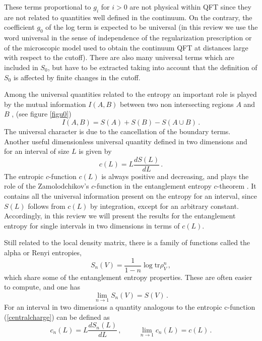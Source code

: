 \documentclass[a4paper]{article}
\begin{document}
These terms proportional to $g_i$ for $i> 0$ are not physical within QFT since they are not related to quantities well defined in the continuum. On the contrary, the coefficient $g_0$ of the log term is expected to be universal (in this review we use the word universal in the sense of independence of the regularization prescription or of the microscopic model used to obtain the continuum QFT at distances large with respect to the cutoff). There are also many universal terms which are included in $S_0$, but have to be extracted taking into account that the definition of $S_0$ is affected by finite changes in the cutoff. 
 
Among the universal quantities related to the entropy an important role is played by the mutual information $I(A,B)$ between two non intersecting regions $A$ and $B$ \cite{chuang}, (see figure \ref{figu0})
\begin{equation}
I(A,B)=S(A)+S(B)-S(A\cup B)\,.
\label{mutual}
\end{equation}
The universal character is due to the cancellation of the boundary terms. 
Another useful dimensionless universal quantity defined in two dimensions and for an interval of size $L$ is given by  
\begin{equation}
c(L)=L \frac{dS(L)}{dL}
\,. \label{centralcharge}
\end{equation}
The entropic $c$-function $c(L)$ is always positive and decreasing, and plays the role of the Zamolodchikov's $c$-function \cite{cteor} in the entanglement entropy $c$-theorem \cite{ch1}. It contains all the universal information present on the entropy for an interval, since $S(L)$ follows from $c(L)$ by integration, except for an arbitrary constant. Accordingly, in this review we will present the results for the entanglement entropy for single intervals in two dimensions in terms of $c(L)$.


Still related to the local density matrix, there is a family of functions called the alpha or Renyi entropies,  
\begin{equation}
S_n(V)=\frac{1}{1-n}\log \textrm{tr}\rho^n_V\,,\label{esealfa}
\end{equation}
which share some of the entanglement entropy properties.
These are often easier to compute, and one has
\begin{equation}
\lim_{n\rightarrow 1} S_n(V) =S(V)\,.\label{alpha}
\end{equation}
For an interval in two dimensions a quantity analogous to the entropic c-function (\ref{centralcharge}) can be defined as
\begin{equation}
c_n(L)=L \frac{dS_n(L)}{dL}\,, \hspace{1cm} \lim_{n\rightarrow 1} c_n(L)=c(L)\,.\label{charge1}
\end{equation}
\end{document}
